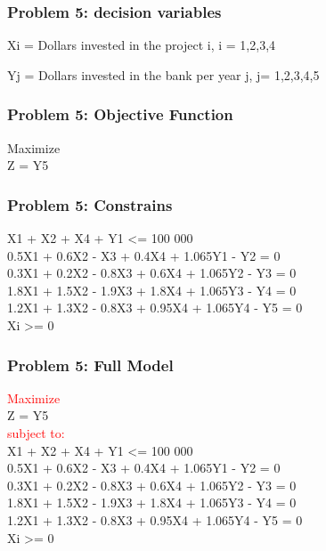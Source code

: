 \documentclass[10pt,svgnames,fragile]{beamer}
\begin{document}
\begin{frame}[label={sec:orge9abdcb}]{}
\frametitle{Problem 5: decision variables }

Xi =  Dollars invested in the project 
i, i = 1,2,3,4

Yj = Dollars invested in the bank per year
j, j= 1,2,3,4,5



\end{frame}

\begin{frame}[label={sec:orge9abdcb}]{}

\frametitle{Problem 5: Objective Function }
Maximize\\[1em]

Z =  Y5


\end{frame}

\begin{frame}[label={sec:orge9abdcb}]{}
\frametitle{Problem 5: Constrains }
X1 + X2 + X4 + Y1 <= 100 000\\
0.5X1 + 0.6X2 - X3 + 0.4X4 + 1.065Y1 - Y2 = 0\\
0.3X1 + 0.2X2 - 0.8X3 + 0.6X4 + 1.065Y2 - Y3 = 0\\
1.8X1 + 1.5X2 - 1.9X3 + 1.8X4 + 1.065Y3 - Y4 = 0\\
1.2X1 + 1.3X2 - 0.8X3 + 0.95X4 + 1.065Y4 - Y5 = 0\\

Xi >= 0

\end{frame}

\begin{frame}[label={sec:orge9abdcb}]{}
\frametitle{Problem 5: Full Model }
\textcolor{red}{Maximize}\\[1em]

Z =  Y5\\[1em]
\textcolor{red}{subject to:}\\[1em]
X1 + X2 + X4 + Y1 <= 100 000\\
0.5X1 + 0.6X2 - X3 + 0.4X4 + 1.065Y1 - Y2 = 0\\
0.3X1 + 0.2X2 - 0.8X3 + 0.6X4 + 1.065Y2 - Y3 = 0\\
1.8X1 + 1.5X2 - 1.9X3 + 1.8X4 + 1.065Y3 - Y4 = 0\\
1.2X1 + 1.3X2 - 0.8X3 + 0.95X4 + 1.065Y4 - Y5 = 0\\
Xi >= 0
\end{frame}
\end{document}
